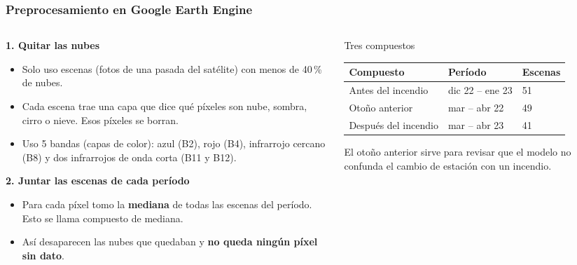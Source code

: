 \documentclass[10pt,aspectratio=169]{beamer}
\begin{document}
\begin{frame}
  \frametitle{Preprocesamiento en Google Earth Engine}
  \small
  \begin{columns}[T]
    \begin{column}{.52\textwidth}
      \textbf{1. Quitar las nubes}
      \begin{itemize}\itemsep0.15em
        \item Solo uso escenas (fotos de una pasada del satélite) con menos de 40\,\% de nubes.
        \item Cada escena trae una capa que dice qué píxeles son nube, sombra, cirro o nieve. Esos píxeles se borran.
        \item Uso 5 bandas (capas de color): azul (B2), rojo (B4), infrarrojo cercano (B8) y dos infrarrojos de onda corta (B11 y B12).
      \end{itemize}
      \vspace{0.3em}
      \textbf{2. Juntar las escenas de cada período}
      \begin{itemize}\itemsep0.15em
        \item Para cada píxel tomo la \textbf{mediana} de todas las escenas del período. Esto se llama compuesto de mediana.
        \item Así desaparecen las nubes que quedaban y \textbf{no queda ningún píxel sin dato}.
      \end{itemize}
    \end{column}
    \begin{column}{.44\textwidth}
      \begin{block}{Tres compuestos}
        \footnotesize
        \begin{tabular}{@{}lll@{}}
          \toprule
          \textbf{Compuesto} & \textbf{Período} & \textbf{Escenas} \\
          \midrule
          Antes del incendio & dic 22 -- ene 23 & 51 \\
          Otoño anterior & mar -- abr 22 & 49 \\
          Después del incendio & mar -- abr 23 & 41 \\
          \bottomrule
        \end{tabular}
      \end{block}
      El otoño anterior sirve para revisar que el modelo no confunda el cambio de estación con un incendio.
    \end{column}
  \end{columns}
\end{frame}
\end{document}
